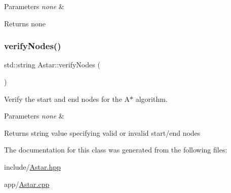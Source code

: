 \begin{DoxyParams}{Parameters}
{\em none} & \\
\hline
\end{DoxyParams}
\begin{DoxyReturn}{Returns}
none 
\end{DoxyReturn}
\mbox{\label{class_astar_a0a5748c39ed15854ad09e8c6a51a2205}} 
\subsubsection{\texorpdfstring{verify\+Nodes()}{verifyNodes()}}
{\footnotesize\ttfamily std\+::string Astar\+::verify\+Nodes (\begin{DoxyParamCaption}{ }\end{DoxyParamCaption})}



Verify the start and end nodes for the A$\ast$ algorithm. 


\begin{DoxyParams}{Parameters}
{\em none} & \\
\hline
\end{DoxyParams}
\begin{DoxyReturn}{Returns}
string value specifying valid or invalid start/end nodes 
\end{DoxyReturn}


The documentation for this class was generated from the following files\+:\begin{DoxyCompactItemize}
\item 
include/\mbox{\hyperlink{_astar_8hpp}{Astar.\+hpp}}\item 
app/\mbox{\hyperlink{_astar_8cpp}{Astar.\+cpp}}\end{DoxyCompactItemize}
